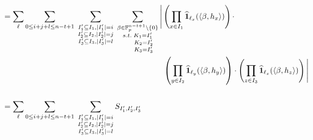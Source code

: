 {\begin{align}
&= \sum_{\vec{\ell}}\sum_{0\leq i+j+l\leq n-t+1} \; \sum_{\substack{I'_1\subseteq I_1,|I'_1|=i\\ I'_2\subseteq I_2,|I'_2|=j\\ I'_3\subseteq I_3,|I'_3|=l\\}} \; \sum_{\substack{\beta\in \F^{n-t+1}_p\setminus{\{0\}}\label{eq:6}\\ s.t.\;K_1=I'_1\\ \indent K_2=I'_2\\ \indent K_3=I'_3}} 
\Bigg|
\left(\prod_{x\in I_1}\widehat{\mathbf{1}}_{\ell_x}(\ip{\beta,h_x})\right)\cdot \\
& \hphantom{{}=\sum_{\vec{\ell}}\sum_{0\leq i+j+l\leq n-t+1} \sum_{\substack{I'_1\subseteq I_1,|I'_1|=i\\ I'_2\subseteq I_2,|I'_2|=j\\ I'_3\subseteq I_3,|I'_3|=l\\}} \sum_{\substack{\beta\in \F^{n-t+1}_p\setminus{\{0\}} s.t.\\ K_1=I'_1\\ K_2=I'_2\\ K_3=I'_3}}} 
\left(\prod_{y\in I_2}\widehat{\mathbf{1}}_{\ell_y}(\ip{\beta,h_y})\right)\cdot 
\left(\prod_{z\in I_3}\widehat{\mathbf{1}}_{\ell_z}(\ip{\beta,h_z})\right)
\Bigg|\nonumber \\ 
&\nonumber \\
&= \sum_{\vec{\ell}}\sum_{0\leq i+j+l\leq n-t+1} \; \sum_{\substack{I'_1\subseteq I_1,|I'_1|=i\\ I'_2\subseteq I_2,|I'_2|=j\\ I'_3\subseteq I_3,|I'_3|=l\\}}S_{I'_1,I'_2,I'_3}
\end{align}}

